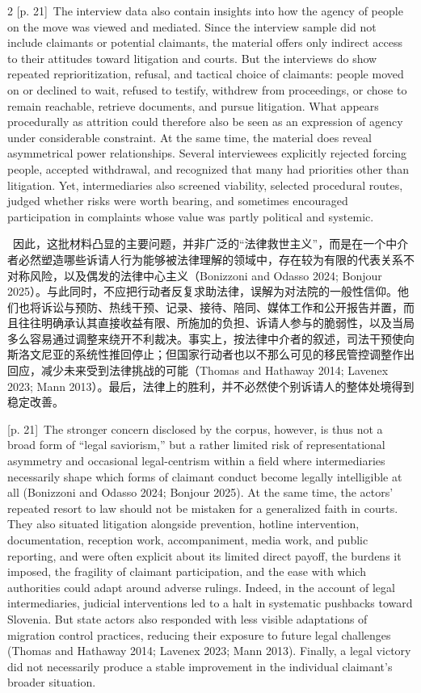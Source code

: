 \documentclass[10pt,a4paper]{article}
\begin{document}
\begin{paracol}{2}
\switchcolumn
{\scriptsize\color{gray} [p. 21]}\ The interview data also contain insights into how the agency of people on the move was viewed and mediated. Since the interview sample did not include claimants or potential claimants, the material offers only indirect access to their attitudes toward litigation and courts. But the interviews do show repeated reprioritization, refusal, and tactical choice of claimants: people moved on or declined to wait, refused to testify, withdrew from proceedings, or chose to remain reachable, retrieve documents, and pursue litigation. What appears procedurally as attrition could therefore also be seen as an expression of agency under considerable constraint. At the same time, the material does reveal asymmetrical power relationships. Several interviewees explicitly rejected forcing people, accepted withdrawal, and recognized that many had priorities other than litigation. Yet, intermediaries also screened viability, selected procedural routes, judged whether risks were worth bearing, and sometimes encouraged participation in complaints whose value was partly political and systemic.\par
\switchcolumn*
{\scriptsize\color{gray} [p. 21]}\ 因此，这批材料凸显的主要问题，并非广泛的“法律救世主义”，而是在一个中介者必然塑造哪些诉请人行为能够被法律理解的领域中，存在较为有限的代表关系不对称风险，以及偶发的法律中心主义（Bonizzoni and Odasso 2024; Bonjour 2025）。与此同时，不应把行动者反复求助法律，误解为对法院的一般性信仰。他们也将诉讼与预防、热线干预、记录、接待、陪同、媒体工作和公开报告并置，而且往往明确承认其直接收益有限、所施加的负担、诉请人参与的脆弱性，以及当局多么容易通过调整来绕开不利裁决。事实上，按法律中介者的叙述，司法干预使向斯洛文尼亚的系统性推回停止；但国家行动者也以不那么可见的移民管控调整作出回应，减少未来受到法律挑战的可能（Thomas and Hathaway 2014; Lavenex 2023; Mann 2013）。最后，法律上的胜利，并不必然使个别诉请人的整体处境得到稳定改善。\par
\switchcolumn
{\scriptsize\color{gray} [p. 21]}\ The stronger concern disclosed by the corpus, however, is thus not a broad form of “legal saviorism,” but a rather limited risk of representational asymmetry and occasional legal-centrism within a field where intermediaries necessarily shape which forms of claimant conduct become legally intelligible at all (Bonizzoni and Odasso 2024; Bonjour 2025). At the same time, the actors’ repeated resort to law should not be mistaken for a generalized faith in courts. They also situated litigation alongside prevention, hotline intervention, documentation, reception work, accompaniment, media work, and public reporting, and were often explicit about its limited direct payoff, the burdens it imposed, the fragility of claimant participation, and the ease with which authorities could adapt around adverse rulings. Indeed, in the account of legal intermediaries, judicial interventions led to a halt in systematic pushbacks toward Slovenia. But state actors also responded with less visible adaptations of migration control practices, reducing their exposure to future legal challenges (Thomas and Hathaway 2014; Lavenex 2023; Mann 2013). Finally, a legal victory did not necessarily produce a stable improvement in the individual claimant’s broader situation.\par

\end{paracol}
\end{document}
